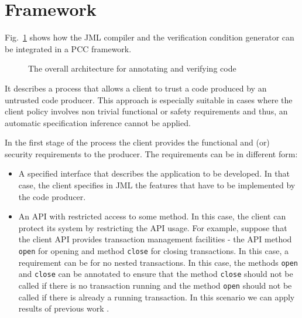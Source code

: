 \section{Framework}
\label{architecture_s}	


Fig.~\ref{architecture} shows how the JML compiler and the verification condition generator can be integrated in a PCC framework.  
  

\begin{figure}[!tbp]
\begin{center}
\caption{The overall architecture for annotating and verifying code}
\label{architecture}
\end{center}
\end{figure}

It describes a process that allows a client to trust a code produced by an untrusted code producer. This approach is especially suitable
 in cases where the client policy involves non trivial functional or safety requirements and thus, an automatic specification inference cannot be applied.

In the first stage of the process the client provides the functional and (or) security requirements to the producer.
 The requirements can be in different form:
\begin{itemize}
\item A specified interface that describes the application to be developed. In that case,
 the client specifies in JML the features that have to be implemented by the code producer.
\item An API with restricted access to some method. In this case, the client can protect its system by restricting the API usage.
For example, suppose that the client API provides transaction management facilities - the API method \texttt{open} for opening and method \texttt{close} for closing transactions. In this case, a requirement can be for no nested transactions.
In this case, the methods \texttt{open} and \texttt{close} can be annotated to ensure that the method \texttt{close} 
 should not be called if there is no transaction running and the method \texttt{open} should not be called if there is already a running transaction. In this scenario we can apply results of previous work \cite{PBBHL}.  
\end{itemize}

